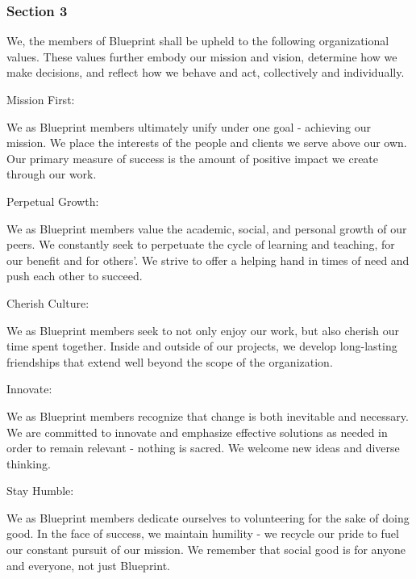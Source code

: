 \documentclass{article}
\begin{document}
\subsubsection{Section 3}

We, the members of Blueprint shall be upheld to the following organizational values. These values further embody our mission and vision, determine how we make decisions, and reflect how we behave and act, collectively and individually.

Mission First:

We as Blueprint members ultimately unify under one goal -  achieving our mission. We place the interests of the people and clients we serve above our own. Our primary measure of success is the amount of positive impact we create through our work.

Perpetual Growth:

We as Blueprint members value the academic, social, and personal growth of our peers. We constantly seek to perpetuate the cycle of learning and teaching, for our benefit and for others’. We strive to offer a helping hand in times of need and push each other to succeed.

Cherish Culture:

We as Blueprint members seek to not only enjoy our work, but also cherish our time spent together. Inside and outside of our projects, we develop long-lasting friendships that extend well beyond the scope of the organization. 

Innovate:

We as Blueprint members recognize that change is both inevitable and necessary. We are committed to innovate and emphasize effective solutions as needed in order to remain relevant - nothing is sacred. We welcome new ideas and diverse thinking.

Stay Humble:

We as Blueprint members dedicate ourselves to volunteering for the sake of doing good. In the face of success, we maintain humility - we recycle our pride to fuel our constant pursuit of our mission. We remember that social good is for anyone and everyone, not just Blueprint. 
\end{document}
